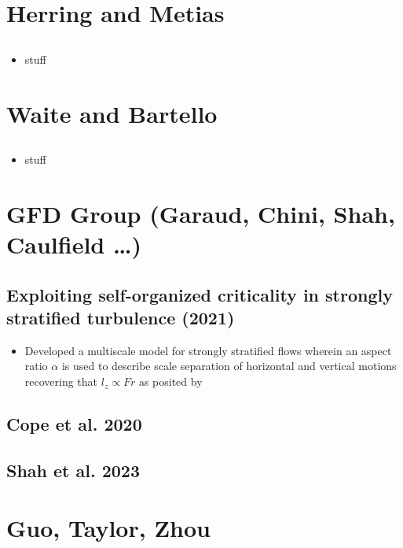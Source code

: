 \documentclass{article}
\begin{document}
\section{Herring and Metias}
    \subsection{}
    \begin{itemize}
        \item stuff
    \end{itemize}

\section{Waite and Bartello}
    \subsection{}
    \begin{itemize}
        \item stuff
    \end{itemize}


\section{GFD Group (Garaud, Chini, Shah, Caulfield \ldots)}
    \subsection{Exploiting self-organized criticality in strongly stratified
    turbulence (2021)}
    \begin{itemize}
        \item Developed a multiscale model for strongly stratified flows wherein an
        aspect ratio $\alpha$ is used to describe scale separation of horizontal and
        vertical motions recovering that $l_z \propto Fr$ as posited by
    \end{itemize}

    \subsection{Cope et al. 2020}

    \subsection{Shah et al. 2023}

\section{Guo, Taylor, Zhou}
\end{document}
